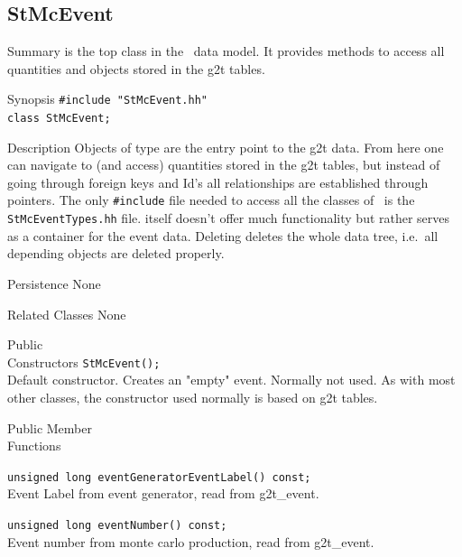\subsection{StMcEvent}
\label{sec:StMcEvent}
\begin{Entry}
\item[Summary]
     is the top class in the \StMcEvent\ data model.
    It provides methods to access all quantities and objects
    stored in the g2t tables.

\item[Synopsis]
    \verb+#include "StMcEvent.hh"+\\
    \verb+class StMcEvent;+\\

\item[Description]
    Objects of type  are the entry point to the g2t data.
    From here one can navigate to (and access) quantities stored
    in the g2t tables, but instead of going through foreign keys and
     Id's all relationships are established through pointers. 
    The only {\tt \#include} file needed to access all the classes of \StMcEvent\
    is the {\tt StMcEventTypes.hh} file. 
     itself doesn't offer much functionality but rather serves
    as a container for the event data.
    Deleting  deletes the whole data tree, i.e.~all depending objects
    are deleted properly.

\item[Persistence]
    None

\item[Related Classes]
    None

\item[Public\\ Constructors]
    \verb+StMcEvent();+\\
    Default constructor. Creates an "empty" event.  Normally not used.  As with
    most other classes, the constructor used normally is based on g2t tables.

\item[Public Member\\ Functions]
    

    \verb+unsigned long eventGeneratorEventLabel() const;+\\
    Event Label from event generator, read from g2t\_event.

    \verb+unsigned long eventNumber() const;+\\
    Event number from monte carlo production, read from g2t\_event.
    \index{event number}


\end{Entry}
